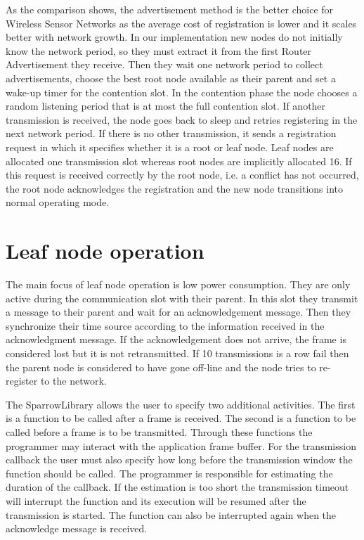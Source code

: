 As the comparison shows, the advertisement method is the better choice for
Wireless Sensor Networks as the average cost of registration is lower and it
scales better with network growth. In our implementation new nodes do not
initially know the network period, so they must extract it from the first
Router Advertisement they receive. Then they wait one network period to collect
advertisements, choose the best root node available as their parent and set a
wake-up timer for the contention slot. In the contention phase the node chooses
a random listening period that is at most the full contention slot. If another
transmission is received, the node goes back to sleep and retries registering
in the next network period. If there is no other transmission, it sends a
registration request in which it specifies whether it is a root or leaf node.
Leaf nodes are allocated one transmission slot whereas root nodes are
implicitly allocated 16. If this request is received correctly by the root
node, i.e. a conflict has not occurred, the root node acknowledges the
registration and the new node transitions into normal operating mode.

\section{Leaf node operation}
\label{sec:leaf_node_operation}

The main focus of leaf node operation is low power consumption. They are only
active during the communication slot with their parent. In this slot they
transmit a message to their parent and wait for an acknowledgement message.
Then they synchronize their time source according to the information received
in the acknowledgment message. If the acknowledgement does not arrive, the
frame is considered lost but it is not retransmitted. If 10 transmissions is a
row fail then the parent node is considered to have gone off-line and the node
tries to re-register to the network. 

The SparrowLibrary allows the user to specify two additional activities. The
first is a function to be called after a frame is received. The second is a
function to be called before a frame is to be transmitted. Through these
functions the programmer may interact with the application frame buffer. For
the transmission callback the user must also specify how long before the
transmission window the function should be called. The programmer is
responsible for estimating the duration of the callback. If the estimation is
too short the transmission timeout will interrupt the function and its
execution will be resumed after the transmission is started. The function can
also be interrupted again when the acknowledge message is received.


